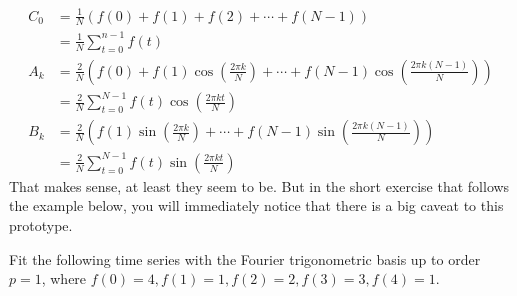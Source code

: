 \begin{subequations}
\begin{align}
C_0 &= \frac{1}{N}(f(0) + f(1) + f(2) + \cdots + f(N-1)) \nonumber \\
&= \frac{1}{N}\sum_{t=0}^{n-1} f(t) \label{eqn:protoDFTc}  \\
A_k &= \frac{2}{N}\left(f(0) + f(1)\cos(\frac{2\pi k}{N}) + \cdots + f(N-1)\cos(\frac{2\pi k(N-1)}{N})\right) \nonumber \\
&= \frac{2}{N}\sum_{t=0}^{N-1} f(t)\cos(\frac{2\pi kt}{N}) \label{eqn:protoDFTa} \\
B_k &= \frac{2}{N}\left(f(1)\sin(\frac{2\pi k}{N}) + \cdots + f(N-1)\sin(\frac{2\pi k (N-1)}{N})\right) \nonumber \\
&= \frac{2}{N}\sum_{t=0}^{N-1} f(t)\sin(\frac{2\pi kt}{N}) \label{eqn:protoDFTb}
\end{align}
\end{subequations}
That makes sense, at least they seem to be. But in the short exercise that follows the example below, you will immediately notice that there is a big caveat to this prototype.
\begin{exmp}
\label{exmp:ex11.2.1}
Fit the following time series with the Fourier trigonometric basis up to order $p=1$, where $f(0) = 4, f(1) = 1, f(2) = 2, f(3) = 3, f(4) = 1$.
\end{exmp}
